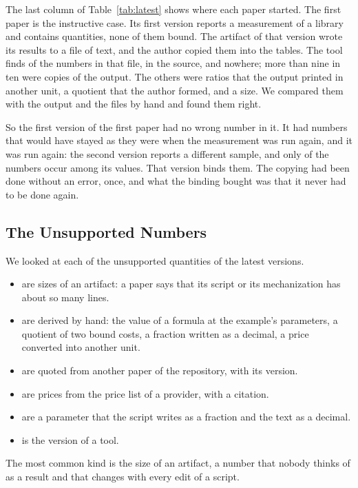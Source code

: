 \documentclass[acmsmall,nonacm,screen]{acmart}
\newcommand{\claim}[2]{#2}
\begin{document}
The last column of Table~\ref{tab:latest} shows where each paper started. The first paper is the
instructive case. Its first version reports a measurement of a library and contains
\exOneHand{} quantities, none of them bound. The artifact of that version wrote its results
to a file of text, and the author copied them into the tables. The tool finds \exOneCopied{}
of the \exOneHand{} numbers in that file, \exOneSource{} in the source, and \exOneDerived{}
nowhere; \claim{copied-most}{more than nine in ten were copies of the output}. The
others were ratios that the output printed in another unit, a quotient that the author
formed, and a size. We compared them with the output and the files by hand and found them
right.

So the first version of the first paper had no wrong number in it. It had \exOneHand{}
numbers that would have stayed as they were when the measurement was run again, and it was
run again: the second version reports a different sample, and only \exOneSame{} of the
\exOneHand{} numbers occur among its values. That
version binds them. The copying had been done without an error, once, and what the binding
bought was that it never had to be done again.

\subsection{The Unsupported Numbers}

We looked at each of the \exAllUnsup{} unsupported quantities of the latest versions.
\begin{itemize}
\item \exKindSize{} are sizes of an artifact: a paper says that its script or its
  mechanization has about so many lines.
\item \exKindDerived{} are derived by hand: the value of a formula at the example's
  parameters, a quotient of two bound costs, a fraction written as a decimal, a price
  converted into another unit.
\item \exKindCited{} are quoted from another paper of the repository, with its version.
\item \exKindExternal{} are prices from the price list of a provider, with a citation.
\item \exKindNotation{} are a parameter that the script writes as a fraction and the text as
  a decimal.
\item \exKindVersion{} is the version of a tool.
\end{itemize}
\claim{sizes-most}{The most common kind is the size of an artifact}, a number that nobody
thinks of as a result and that changes with every edit of a script.
\end{document}
